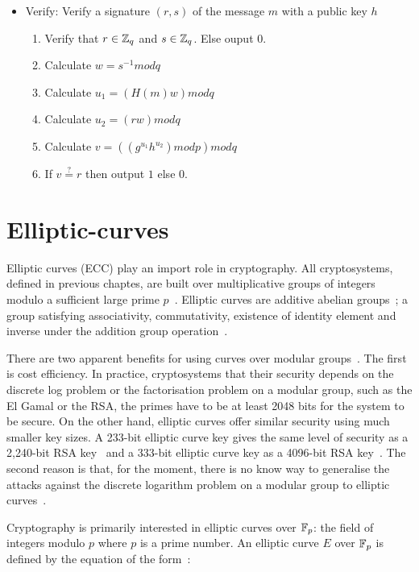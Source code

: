 \begin{itemize}
  \item Verify: Verify a signature $(r, s)$ of the message $m$ with a public key $h$
    \begin{enumerate}
      \item Verify that $r \in \mathbb{Z}_q$ and $s \in \mathbb{Z}_q$. Else ouput $0$.
      \item Calculate $w = s^{-1}modq$
      \item Calculate $u_1 = (H(m)w)modq$
      \item Calculate $u_2 = (rw)modq$
      \item Calculate $v = ((g^{u_1}h^{u_2})modp)modq$
      \item If $v \stackrel{?}{=} r$ then output $1$ else $0$.
    \end{enumerate}
\end{itemize}

\section{Elliptic-curves}
\label{preliminaries:el_curves}

Elliptic curves (ECC) play an import role in cryptography. All cryptosystems, defined in previous chaptes, are built over multiplicative groups of integers modulo a sufficient large prime $p$~\cite{kiagias:crypto, boneh_crypto}. Elliptic curves are additive abelian groups~\cite{kiagias:crypto}; a group satisfying associativity, commutativity, existence of identity element and inverse under the addition group operation~\cite{elliptic_curves_2}.

There are two apparent benefits for using curves over modular groups~\cite{kiagias:crypto}. The first is cost efficiency. In practice, cryptosystems that their security depends on the discrete log problem or the factorisation problem on a modular group, such as the El Gamal or the RSA, the primes have to be at least 2048 bits for the system to be secure. On the other hand, elliptic curves offer similar security using much smaller key sizes. A 233-bit elliptic curve key gives the same level of security as a 2,240-bit RSA key~\cite{ecc_rsa_bits, ecc_rsa_bits_1} and a 333-bit elliptic curve key as a 4096-bit RSA key~\cite{blake1999elliptic}. The second reason is that, for the moment, there is no know way to generalise the attacks against the discrete logarithm problem on a modular group to elliptic curves~\cite{kiagias:crypto}.

Cryptography is primarily interested in elliptic curves over $\mathbb{F}_p$: the field of integers modulo $p$ where $p$ is a prime number. An elliptic curve $E$ over $\mathbb{F}_p$ is defined by the equation of the form~\cite{elliptic_curves, elliptic_curves_2}:

